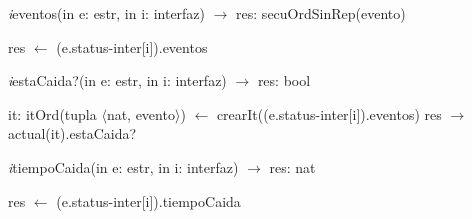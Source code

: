 \textit{i}eventos(in e: estr, in i: interfaz) $\longrightarrow$ res: secuOrdSinRep(evento)\\
\begin{algorithm}[H]
\BlankLine
res $\leftarrow$ (e.status-inter[i]).eventos
\end{algorithm}

\vspace{11pt}

\textit{i}estaCaida?(in e: estr, in i: interfaz) $\longrightarrow$ res: bool\\
\begin{algorithm}[H]
\BlankLine
it: itOrd(tupla $\langle$nat, evento$\rangle$) $\leftarrow$ crearIt((e.status-inter[i]).eventos) 
\BlankLine
res $\rightarrow$ actual(it).estaCaida?
\end{algorithm}

\vspace{11pt}

\textit{i}tiempoCaida(in e: estr, in i: interfaz) $\longrightarrow$ res: nat\\
\begin{algorithm}[H]
res $\leftarrow$ (e.status-inter[i]).tiempoCaida
\end{algorithm}

\vspace{11pt}

